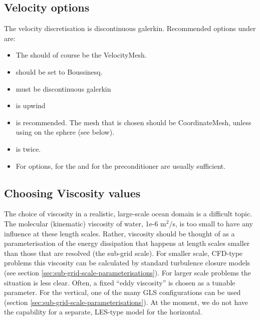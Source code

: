 \subsection{Velocity options}
The velocity discretisation is discontinuous galerkin. Recommended options under
 are:

\begin{itemize}
  \item The  should of course be the VelocityMesh.
  \item {} should be set to Boussinesq.
  \item {} must be discontinuous galerkin
  \item {} is upwind
  \item
     is
    recommended. The mesh that is chosen should be CoordinateMesh, unless
    using  on the sphere (see below).
  \item
    is twice.
  \item For  options,  for the
     and  for the preconditioner are
    usually sufficient.
\end{itemize}

\subsection{Choosing Viscosity values}
The choice of viscosity in a realistic, large-scale ocean domain is a difficult
topic. The molecular (kinematic) viscosity of water, 1e-6 m$^2/$s, is too small
to have any influence at these length scales. Rather, viscosity should be thought
of as a parameterisation of the energy dissipation that happens at length scales
smaller than those that are resolved (the sub-grid scale). For smaller
scale, CFD-type problems this viscosity can be calculated by standard turbulence
closure models (see section \ref{sec:sub-grid-scale-parameterisations}). For
larger scale problems the situation is less clear. Often, a fixed ``eddy
viscosity'' is chosen as a tunable parameter. For the vertical, one of the many
GLS configurations can be used (section
\ref{sec:sub-grid-scale-parameterisations}). At the moment, we do not have the
capability for a separate, LES-type model for the horizontal.

